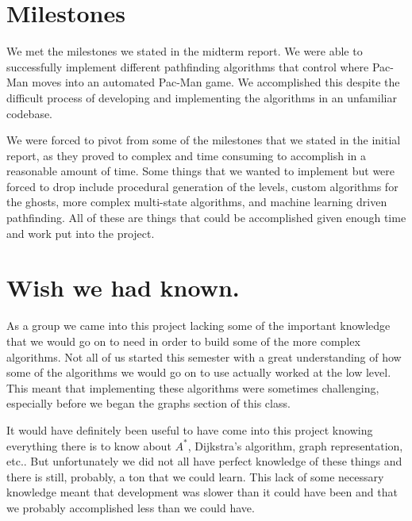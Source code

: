\documentclass[12pt]{article}
\begin{document}
  \section*{Milestones}
    We met the milestones we stated in the midterm report. We were able to successfully implement different pathfinding algorithms that control where Pac-Man moves into an automated Pac-Man game. We accomplished this despite the difficult process of developing and implementing the algorithms in an unfamiliar codebase.

    We were forced to pivot from some of the milestones that we stated in the initial report, as they proved to complex and time consuming to accomplish in a reasonable amount of time. Some things that we wanted to implement but were forced to drop include procedural generation of the levels, custom algorithms for the ghosts, more complex multi-state algorithms, and machine learning driven pathfinding. All of these are things that could be accomplished given enough time and work put into the project.
  \section*{Wish we had known.}
    As a group we came into this project lacking some of the important knowledge that we would go on to need in order to build some of the more complex algorithms. Not all of us started this semester with a great understanding of how some of the algorithms we would go on to use actually worked at the low level. This meant that implementing these algorithms were sometimes challenging, especially before we began the graphs section of this class.

    It would have definitely been useful to have come into this project knowing everything there is to know about $A^*$, Dijkstra's algorithm, graph representation, etc.. But unfortunately we did not all have perfect knowledge of these things and there is still, probably, a ton that we could learn. This lack of some necessary knowledge meant that development was slower than it could have been and that we probably accomplished less than we could have.
\end{document}
